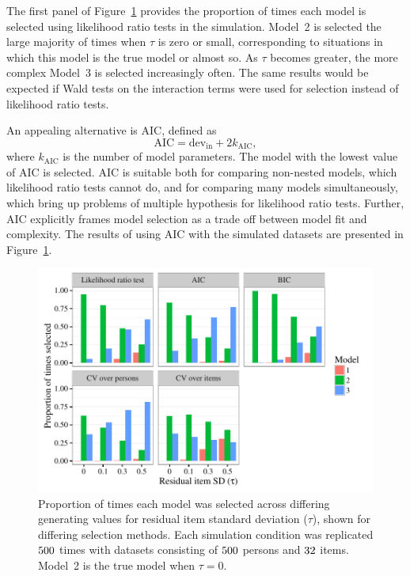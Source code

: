 \documentclass[12pt, letterpaper]{article}
\begin{document}
The first panel of Figure~\ref{fig:select-overtau} provides the proportion of times each model is selected using likelihood ratio tests in the simulation.
Model~2 is selected the large majority of times when $\tau$ is zero or small, corresponding to situations in which this model is the true model or almost so.
As $\tau$ becomes greater, the more complex Model~3 is selected increasingly often.
The same results would be expected if Wald tests on the interaction terms were used for selection instead of likelihood ratio tests.

An appealing alternative is AIC, defined as
\begin{equation} \label{eq:aic}
\mathrm{AIC} = \mathrm{dev_{in}} + 2k_\mathrm{AIC}
,\end{equation}
where $k_\mathrm{AIC}$ is the number of model parameters. The model with the lowest value of AIC is selected.
AIC is suitable both for comparing non-nested models, which likelihood ratio tests cannot do, and for comparing many models simultaneously, which bring up problems of multiple hypothesis for likelihood ratio tests. Further, AIC explicitly frames model selection as a trade off between model fit and complexity. 
The results of using AIC with the simulated datasets are presented in Figure~\ref{fig:select-overtau}. 

\begin{figure}[tbp]
	\centering
	\includegraphics{chapter_2/figs/select_overtau.pdf}
	\caption{Proportion of times each model was selected across differing generating values for residual item standard deviation ($\tau$), shown for differing selection methods. Each simulation condition was replicated $500$ times with datasets consisting of $500$ persons and $32$ items. Model~2 is the true model when $\tau = 0$.}
	\label{fig:select-overtau}
\end{figure}
\end{document}
